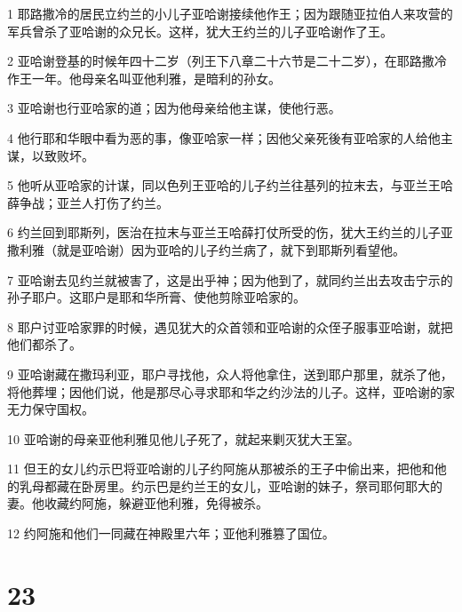 \par 1 耶路撒冷的居民立约兰的小儿子亚哈谢接续他作王；因为跟随亚拉伯人来攻营的军兵曾杀了亚哈谢的众兄长。这样，犹大王约兰的儿子亚哈谢作了王。
\par 2 亚哈谢登基的时候年四十二岁（列王下八章二十六节是二十二岁），在耶路撒冷作王一年。他母亲名叫亚他利雅，是暗利的孙女。
\par 3 亚哈谢也行亚哈家的道；因为他母亲给他主谋，使他行恶。
\par 4 他行耶和华眼中看为恶的事，像亚哈家一样；因他父亲死後有亚哈家的人给他主谋，以致败坏。
\par 5 他听从亚哈家的计谋，同以色列王亚哈的儿子约兰往基列的拉末去，与亚兰王哈薛争战；亚兰人打伤了约兰。
\par 6 约兰回到耶斯列，医治在拉末与亚兰王哈薛打仗所受的伤，犹大王约兰的儿子亚撒利雅（就是亚哈谢）因为亚哈的儿子约兰病了，就下到耶斯列看望他。
\par 7 亚哈谢去见约兰就被害了，这是出乎神；因为他到了，就同约兰出去攻击宁示的孙子耶户。这耶户是耶和华所膏、使他剪除亚哈家的。
\par 8 耶户讨亚哈家罪的时候，遇见犹大的众首领和亚哈谢的众侄子服事亚哈谢，就把他们都杀了。
\par 9 亚哈谢藏在撒玛利亚，耶户寻找他，众人将他拿住，送到耶户那里，就杀了他，将他葬埋；因他们说，他是那尽心寻求耶和华之约沙法的儿子。这样，亚哈谢的家无力保守国权。
\par 10 亚哈谢的母亲亚他利雅见他儿子死了，就起来剿灭犹大王室。
\par 11 但王的女儿约示巴将亚哈谢的儿子约阿施从那被杀的王子中偷出来，把他和他的乳母都藏在卧房里。约示巴是约兰王的女儿，亚哈谢的妹子，祭司耶何耶大的妻。他收藏约阿施，躲避亚他利雅，免得被杀。
\par 12 约阿施和他们一同藏在神殿里六年；亚他利雅篡了国位。

\chapter{23}

